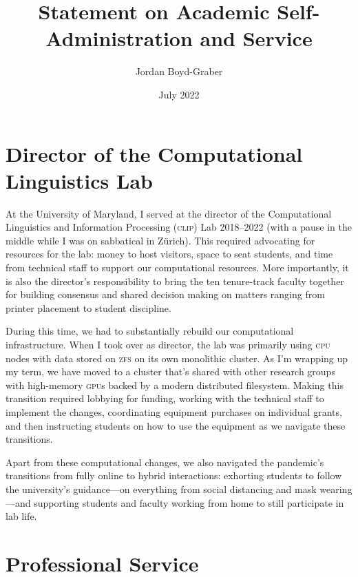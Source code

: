 \documentclass[11pt]{amsart}
\newcommand{\abr}[1]{\textsc{#1}}
\begin{document}
 \title{Statement on Academic Self-Administration and Service}

 \author{Jordan Boyd-Graber}
\address{University of Maryland}

\date{July 2022}


\keywords{}

\maketitle

\section{Director of the Computational Linguistics Lab}

At the University of Maryland, I served at the director of the
Computational Linguistics and Information Processing (\abr{clip}) Lab
2018--2022 (with a pause in the middle while I was on sabbatical in
Z\"urich).
%
This required advocating for resources for the lab: money to host
visitors, space to seat students, and time from technical staff to
support our computational resources.
%
More importantly, it is also the director's responsibility to bring
the ten tenure-track faculty together for building consensus and shared
decision making on matters ranging from printer placement to student
discipline.

During this time, we had to substantially rebuild our computational
infrastructure.
%
When I took over as director, the lab was primarily using \abr{cpu}
nodes with data stored on \abr{zfs} on its own monolithic cluster.
%
As I'm wrapping up my term, we have moved to a cluster that's shared
with other research groups with high-memory \abr{gpu}s backed by a
modern distributed filesystem.
%
Making this transition required lobbying for funding, working with the
technical staff to implement the changes, coordinating equipment
purchases on individual grants, and then instructing students
on how to use the equipment as we navigate these transitions.

Apart from these computational changes, we also navigated the
pandemic's transitions from fully online to hybrid interactions:
exhorting students to follow the university's guidance---on everything
from social distancing and mask wearing---and supporting students and
faculty working from home to still participate in
lab life.

\section{Professional Service}
\end{document}
